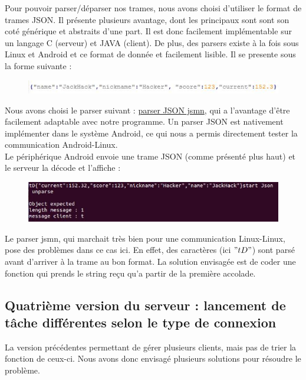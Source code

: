 \documentclass[a4paper,10pt]{article}
\begin{document}
Pour pouvoir parser/déparser nos trames, nous avons choisi d'utiliser  le format de trames JSON. Il présente plusieurs avantage, dont les principaux sont sont son coté générique et abstraits d'une part. Il est donc facilement implémentable sur un langage C (serveur) et JAVA (client). De plus, des parsers existe à la fois sous Linux et Android et ce format de donnée et facilement lisible. Il se presente sous la forme suivante :
\begin{figure}[H]
\centering\includegraphics[scale=0.7]{images/JSON_trame.jpg}
\end{figure}

Nous avons choisi le parser suivant : \href{https://bitbucket.org/zserge/jsmn/wiki/Home}{parser JSON jsmn}, qui a l'avantage d'être facilement adaptable avec notre programme. Un parser JSON est nativement implémenter dans le système Android, ce qui nous a permis directement tester la communication Android-Linux. \\ 
Le périphérique Android envoie une trame JSON (comme présenté plus haut) et le serveur la décode et l'affiche : 
\begin{figure}[H]
\centering\includegraphics[scale=0.7]{images/test_JSON_litle.jpg}
\end{figure}

Le parser jsmn, qui marchait très bien pour une communication Linux-Linux, pose des problèmes dans ce cas ici. En effet, des caractères (ici $"tD"$) sont parsé avant d'arriver à la trame au bon format. La solution envisagée est de coder une fonction qui prends le string reçu qu'a partir de la première accolade.



\subsection{Quatrième version du serveur : lancement de tâche différentes selon le type de connexion}

La version précédentes permettant de gérer plusieurs clients, mais pas de trier la fonction de ceux-ci. Nous avons donc envisagé plusieurs solutions pour résoudre le problème. 
\end{document}

